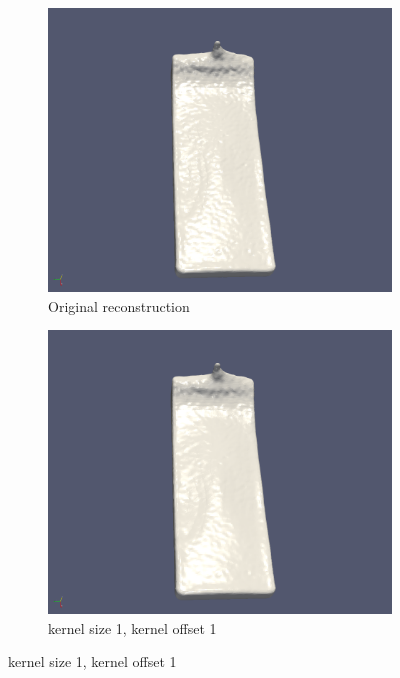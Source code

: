 \begin{figure}[H]
        \begin{subfigure}[b]{0.5\textwidth}
               \includegraphics[width=\textwidth]{figures/DBBlur_ks-0_ko-0.png}
               \caption{Original reconstruction}
               \label{fig:kskdOrig}
        \end{subfigure}
        \begin{subfigure}[b]{0.5\textwidth}
               \includegraphics[width=\textwidth]{figures/DBBlur_ks-1_ko-1.png}
               \caption{kernel size 1, kernel offset 1}

\end{subfigure}
\end{figure}
